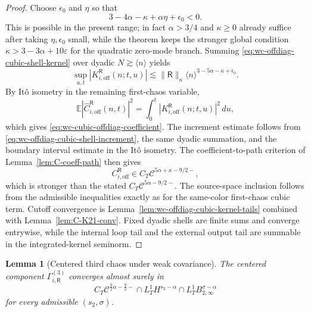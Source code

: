 \documentclass[10pt]{amsart}
\numberwithin{equation}{section}
\theoremstyle{plain}
\newtheorem{lemma}[theorem]{Lemma}
\theoremstyle{definition}
\theoremstyle{remark}
\newcommand{\E}{\mathbb{E}}
\newcommand{\eps}{\varepsilon}
\begin{document}
\begin{proof}
Choose \(\epsilon_0\) and \(\eta\) so that
\[
        3-4\alpha-\kappa+\alpha\eta+\epsilon_0<0.
\]
This is possible in the present range; in fact \(\alpha>3/4\) and \(\kappa\ge0\) already suffice after taking \(\eta,\epsilon_0\) small, while the theorem keeps the stronger global condition \(\kappa>3-3\alpha+10\eps\) for the quadratic zero-mode branch.  Summing \eqref{eq:wc-offdiag-cubic-shell-kernel} over dyadic \(N\gtrsim\langle n\rangle\) yields
\begin{equation}\label{eq:wc-offdiag-cubic-kernel-summed}
        \sup_{u,t}|K_{i,\mathrm{off}}^{\mathsf R}(n;t,u)|
        \lesssim
        \|\mathsf R\|_\kappa\langle n\rangle^{3-5\alpha-\kappa+\epsilon_0}.
\end{equation}
By Itô isometry in the remaining first-chaos variable,
\[
        \E|\widehat C_{i,\mathrm{off}}^{\mathsf R}(n,t)|^2
        =\int_0^t |K_{i,\mathrm{off}}^{\mathsf R}(n;t,u)|^2\,du,
\]
which gives \eqref{eq:wc-cubic-offdiag-coefficient}.  The increment estimate follows from \eqref{eq:wc-offdiag-cubic-shell-increment}, the same dyadic summation, and the boundary interval estimate in the Itô isometry.  The coefficient-to-path criterion of Lemma~\ref{lem:C-coeff-path} then gives
\[
        C_{i,\mathrm{off}}^{\mathsf R}\in C_T\mathcal C^{5\alpha+\kappa-9/2-},
\]
which is stronger than the stated \(C_T\mathcal C^{5\alpha-9/2-}\).  The source-space inclusion follows from the admissible inequalities exactly as for the same-color first-chaos cubic term.  Cutoff convergence is Lemma~\ref{lem:wc-offdiag-cubic-kernel-tails} combined with Lemma~\ref{lem:C-K21-conv}.  Fixed dyadic shells are finite sums and converge entrywise, while the internal loop tail and the external output tail are summable in the integrated-kernel seminorm.
\end{proof}

\begin{lemma}[Centered third chaos under weak covariance]\label{lem:wc-cubic-third-chaos}
The centered component \(\Gamma_{i,\mathsf R}^{(3)}\) converges almost surely in
\[
        C_T\mathcal C^{\frac92\alpha-\frac92-}
        \cap L_T^1H^{s_2-\alpha}\cap L_T^1B_{2,\infty}^{\sigma-\alpha}
\]
for every admissible \((s_2,\sigma)\).
\end{lemma}
\end{document}
